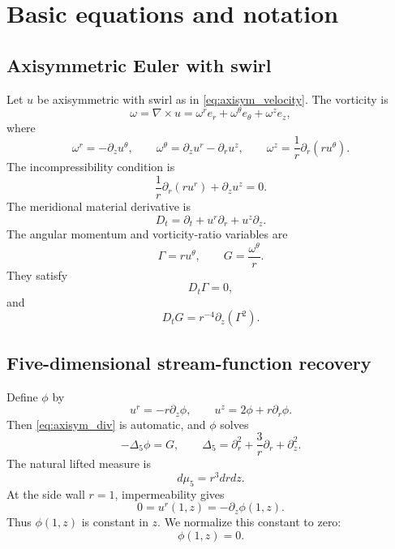 \documentclass[11pt]{amsart}
\begin{document}
\section{Basic equations and notation}

\subsection{Axisymmetric Euler with swirl}

Let \(u\) be axisymmetric with swirl as in \eqref{eq:axisym_velocity}.  The vorticity is
\[
\omega=\nabla\times u=\omega^r e_r+\omega^\theta e_\theta+\omega^z e_z,
\]
where
\begin{equation}\label{eq:vorticity_components}
\omega^r=-\partial_z u^\theta,
\qquad
\omega^\theta=\partial_z u^r-\partial_r u^z,
\qquad
\omega^z=\frac1r\partial_r(r u^\theta).
\end{equation}
The incompressibility condition is
\begin{equation}\label{eq:axisym_div}
\frac1r\partial_r(ru^r)+\partial_z u^z=0.
\end{equation}
The meridional material derivative is
\begin{equation}\label{eq:Dt_def}
D_t=\partial_t+u^r\partial_r+u^z\partial_z.
\end{equation}
The angular momentum and vorticity-ratio variables are
\begin{equation}\label{eq:variables}
\Gamma=ru^\theta,
\qquad
G=\frac{\omega^\theta}{r}.
\end{equation}
They satisfy
\begin{equation}\label{eq:Gamma_eq}
D_t\Gamma=0,
\end{equation}
and
\begin{equation}\label{eq:G_eq}
D_tG=r^{-4}\partial_z(\Gamma^2).
\end{equation}

\subsection{Five-dimensional stream-function recovery}

Define \(\phi\) by
\begin{equation}\label{eq:stream_phi}
u^r=-r\partial_z\phi,
\qquad
u^z=2\phi+r\partial_r\phi.
\end{equation}
Then \eqref{eq:axisym_div} is automatic, and \(\phi\) solves
\begin{equation}\label{eq:phi_eq}
-\Delta_5\phi=G,
\qquad
\Delta_5=\partial_r^2+\frac3r\partial_r+\partial_z^2.
\end{equation}
The natural lifted measure is
\begin{equation}\label{eq:dmu5}
d\mu_5=r^3drdz.
\end{equation}
At the side wall \(r=1\), impermeability gives
\[
0=u^r(1,z)=-\partial_z\phi(1,z).
\]
Thus \(\phi(1,z)\) is constant in \(z\).  We normalize this constant to zero:
\begin{equation}\label{eq:phi_dirichlet_wall}
\phi(1,z)=0.
\end{equation}
\end{document}
